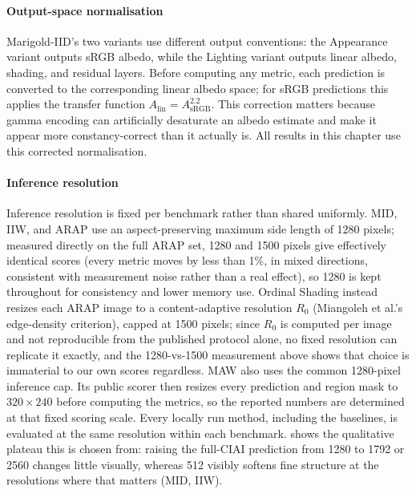 \paragraph{Output-space normalisation}
Marigold-IID's two variants use different output conventions: the Appearance
variant outputs sRGB albedo, while the Lighting variant outputs linear albedo,
shading, and residual layers.
Before computing any metric, each prediction is converted to the corresponding
linear albedo space; for sRGB predictions this applies the transfer function
$A_{\text{lin}} = A_{\text{sRGB}}^{2.2}$.
This correction matters because gamma encoding can artificially desaturate an
albedo estimate and make it appear more constancy-correct than it actually is.
All results in this chapter use this corrected normalisation.

\paragraph{Inference resolution}
Inference resolution is fixed per benchmark rather than shared uniformly.
MID, IIW, and ARAP use an aspect-preserving maximum side length of 1280 pixels;
measured directly on the full ARAP set, 1280 and 1500 pixels give effectively
identical scores (every metric moves by less than 1\%, in mixed directions,
consistent with measurement noise rather than a real effect), so 1280 is kept
throughout for consistency and lower memory use.
Ordinal Shading  instead resizes each ARAP image to a
content-adaptive resolution $R_0$ (Miangoleh et al.'s edge-density criterion),
capped at 1500 pixels; since $R_0$ is computed per image and not reproducible
from the published protocol alone, no fixed resolution can replicate it exactly,
and the 1280-vs-1500 measurement above shows that choice is immaterial to our
own scores regardless.
MAW also uses the common 1280-pixel inference cap. Its public scorer then
resizes every prediction and region mask to $320\times240$ before computing the
metrics, so the reported numbers are determined at that fixed scoring scale.
Every locally run method, including the baselines, is evaluated at the same
resolution within each benchmark.
 shows the qualitative plateau this is chosen from:
raising the full-CIAI prediction from 1280 to 1792 or 2560 changes little
visually, whereas 512 visibly softens fine structure at the resolutions where
that matters (MID, IIW).

